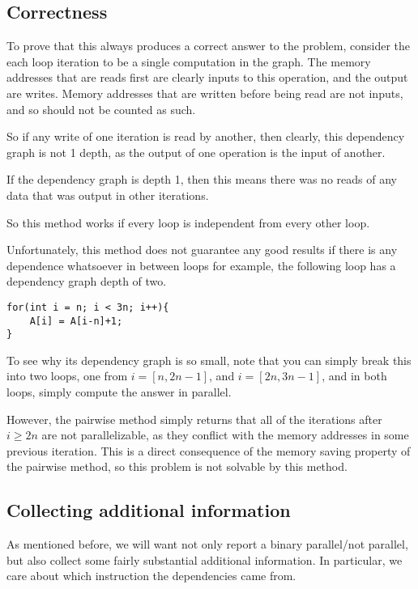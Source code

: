 \documentclass[12pt,twoside]{reedthesis}
\begin{document}
		\subsection{Correctness}

		To prove that this always produces a correct answer to the problem, consider the each loop iteration to be a single computation in the graph. The memory addresses that are reads first are clearly inputs to this operation, and the output are writes. Memory addresses that are written before being read are not inputs, and so should not be counted as such.

		So if any write of one iteration is read by another, then clearly, this dependency graph is not 1 depth, as the output of one operation is the input of another.

		If the dependency graph is depth 1, then this means there was no reads of any data that was output in other iterations.

		So this method works if every loop is independent from every other loop.

		Unfortunately, this method does not guarantee any good results if there is any dependence whatsoever in between loops for example, the following loop has a dependency graph depth of two.

\begin{lstlisting}
for(int i = n; i < 3n; i++){
	A[i] = A[i-n]+1;
}
\end{lstlisting}

		To see why its dependency graph is so small, note that you can simply break this into two loops, one from $i = [n,2n-1]$, and $i=[2n,3n-1]$, and in both loops, simply compute the answer in parallel.

		However, the pairwise method simply returns that all of the iterations after $i \ge 2n$ are not parallelizable, as they conflict with the memory addresses in some previous iteration. This is a direct consequence of the memory saving property of the pairwise method, so this problem is not solvable by this method.

		\subsection{Collecting additional information}

		As mentioned before, we will want not only report a binary parallel/not parallel, but also collect some fairly substantial additional information. In particular, we care about which instruction the dependencies came from.
\end{document}
